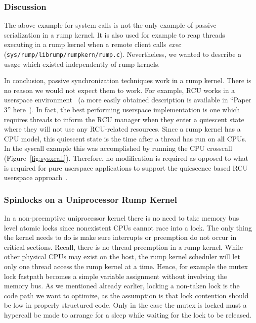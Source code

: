 \subsubsection*{Discussion}

The above example for system calls is not the only example of passive
serialization in a rump kernel.  It is also used for example to
reap threads executing in a rump kernel when a remote client calls
\textit{exec} (\texttt{sys/rump/librump/rumpkern/rump.c}).  Nevertheless,
we wanted to describe a usage which existed independently of rump
kernels.

In conclusion, passive synchronization techniques work in a rump
kernel.  There is no reason we would not expect them to work.  For
example, RCU works in a userspace environment~\cite{desnoyers:urcu}
(a more easily obtained description is available in ``Paper 3''
here~\cite{desnoyers:phd}).  In fact, the best performing userspace
implementation is one which requires threads to inform the RCU
manager when they enter a quiescent state where they will not use
any RCU-related resources.  Since a rump kernel has a CPU model,
this quiescent state is the time after a thread has run on all
CPUs.  In the syscall example this was accomplished by running the
CPU crosscall (Figure~\ref{fig:sysxcall}).  Therefore, no modification is
required as opposed to what is required for pure userspace applications to
support the quiescence based RCU userspace approach~\cite{desnoyers:urcu}.

\subsubsection{Spinlocks on a Uniprocessor Rump Kernel}
\label{sect:spinlockopt}

In a non-preemptive uniprocessor kernel there is no need to take
memory bus level atomic locks since nonexistent CPUs cannot race
into a lock.  The only thing the kernel needs to do is make sure
interrupts or preemption do not occur in critical sections.
Recall, there is no thread preemption in a rump kernel.
While other physical CPUs may exist on the host, the rump kernel
scheduler will let only one thread access the rump kernel at a
time.  Hence, for example the mutex lock fastpath becomes a simple
variable assignment without involving the memory bus.  As we
mentioned already earlier, locking a non-taken lock is the code
path we want to optimize, as the assumption is that lock contention
should be low in properly structured code.  Only in the case the
mutex is locked must a hypercall be made to arrange for a sleep
while waiting for the lock to be released.

